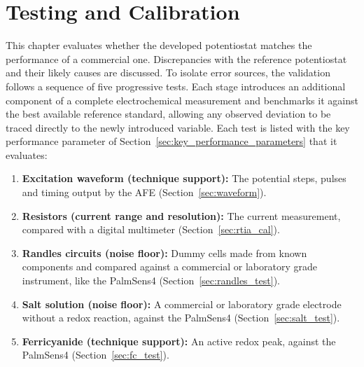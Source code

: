 \providecommand{\devname}{OpenStat}
\providecommand{\testfigdir}{figures/}

\chapter{Testing and Calibration}
\label{chap:testing}

This chapter evaluates whether the developed potentiostat matches the
performance of a commercial one. Discrepancies with the reference potentiostat and their likely causes are discussed. To isolate error
sources, the validation follows a sequence of five progressive tests. Each stage
introduces an additional component of a complete electrochemical measurement
and benchmarks it against the best available reference standard, allowing any
observed deviation to be traced directly to the newly introduced variable. Each test is listed with the key performance parameter of Section~\ref{sec:key_performance_parameters} that it evaluates:
\begin{enumerate}
  \item \textbf{Excitation waveform (technique support):} The potential
    steps, pulses and timing output by the AFE (Section~\ref{sec:waveform}).
  \item \textbf{Resistors (current range and resolution):} The current measurement,
    compared with a digital multimeter (Section~\ref{sec:rtia_cal}).
  \item \textbf{Randles circuits (noise floor):} Dummy cells made from known
    components and compared against a commercial or laboratory grade instrument,
    like the PalmSens4 (Section~\ref{sec:randles_test}).
  \item \textbf{Salt solution (noise floor):} A commercial or laboratory grade
    electrode without a redox reaction, against the PalmSens4
    (Section~\ref{sec:salt_test}).
  \item \textbf{Ferricyanide (technique support):} An active redox peak, against
    the PalmSens4 (Section~\ref{sec:fc_test}).
\end{enumerate}

